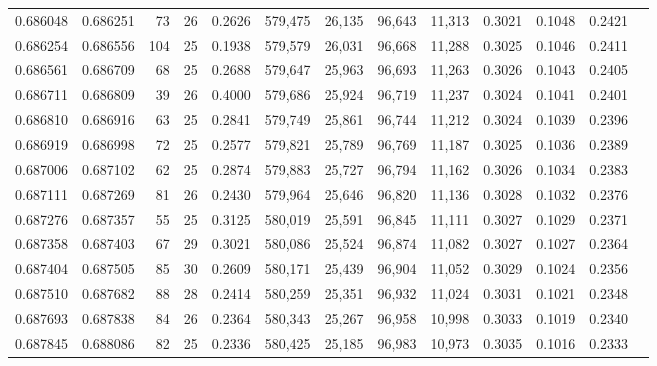 \begin{tabular}{rrrrrrrrrrrrr}
0.686048 & 0.686251 &  73 &  26 &                                     0.2626 & 579,475 &  26,135 &  96,643 &  11,313 & 0.3021 & 0.1048 & 0.2421 \\
0.686254 & 0.686556 & 104 &  25 &                                     0.1938 & 579,579 &  26,031 &  96,668 &  11,288 & 0.3025 & 0.1046 & 0.2411 \\
0.686561 & 0.686709 &  68 &  25 &                                     0.2688 & 579,647 &  25,963 &  96,693 &  11,263 & 0.3026 & 0.1043 & 0.2405 \\
0.686711 & 0.686809 &  39 &  26 &                                     0.4000 & 579,686 &  25,924 &  96,719 &  11,237 & 0.3024 & 0.1041 & 0.2401 \\
0.686810 & 0.686916 &  63 &  25 &                                     0.2841 & 579,749 &  25,861 &  96,744 &  11,212 & 0.3024 & 0.1039 & 0.2396 \\
0.686919 & 0.686998 &  72 &  25 &                                     0.2577 & 579,821 &  25,789 &  96,769 &  11,187 & 0.3025 & 0.1036 & 0.2389 \\
0.687006 & 0.687102 &  62 &  25 &                                     0.2874 & 579,883 &  25,727 &  96,794 &  11,162 & 0.3026 & 0.1034 & 0.2383 \\
0.687111 & 0.687269 &  81 &  26 &                                     0.2430 & 579,964 &  25,646 &  96,820 &  11,136 & 0.3028 & 0.1032 & 0.2376 \\
0.687276 & 0.687357 &  55 &  25 &                                     0.3125 & 580,019 &  25,591 &  96,845 &  11,111 & 0.3027 & 0.1029 & 0.2371 \\
0.687358 & 0.687403 &  67 &  29 &                                     0.3021 & 580,086 &  25,524 &  96,874 &  11,082 & 0.3027 & 0.1027 & 0.2364 \\
0.687404 & 0.687505 &  85 &  30 &                                     0.2609 & 580,171 &  25,439 &  96,904 &  11,052 & 0.3029 & 0.1024 & 0.2356 \\
0.687510 & 0.687682 &  88 &  28 &                                     0.2414 & 580,259 &  25,351 &  96,932 &  11,024 & 0.3031 & 0.1021 & 0.2348 \\
0.687693 & 0.687838 &  84 &  26 &                                     0.2364 & 580,343 &  25,267 &  96,958 &  10,998 & 0.3033 & 0.1019 & 0.2340 \\
0.687845 & 0.688086 &  82 &  25 &                                     0.2336 & 580,425 &  25,185 &  96,983 &  10,973 & 0.3035 & 0.1016 & 0.2333 \\

\end{tabular}
